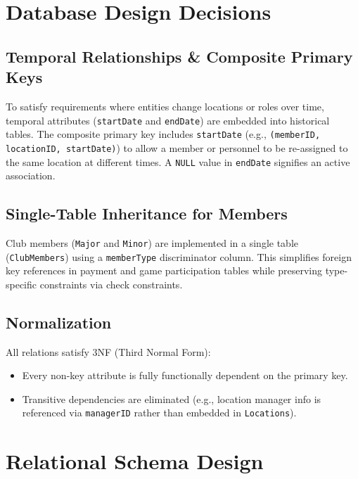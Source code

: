 \documentclass[11pt,a4paper]{article}
\begin{document}
\section{Database Design Decisions}


\subsection{Temporal Relationships \& Composite Primary Keys}

To satisfy requirements where entities change locations or roles over time, temporal attributes (\texttt{startDate} and \texttt{endDate}) are embedded into historical tables. The composite primary key includes \texttt{startDate} (e.g., \texttt{(memberID, locationID, startDate)}) to allow a member or personnel to be re-assigned to the same location at different times. A \texttt{NULL} value in \texttt{endDate} signifies an active association.


\subsection{Single-Table Inheritance for Members}

Club members (\texttt{Major} and \texttt{Minor}) are implemented in a single table (\texttt{ClubMembers}) using a \texttt{memberType} discriminator column. This simplifies foreign key references in payment and game participation tables while preserving type-specific constraints via check constraints.


\subsection{Normalization}

All relations satisfy 3NF (Third Normal Form):
\begin{itemize}
\item Every non-key attribute is fully functionally dependent on the primary key.
\item Transitive dependencies are eliminated (e.g., location manager info is referenced via \texttt{managerID} rather than embedded in \texttt{Locations}).
\end{itemize}





\section{Relational Schema Design}
\end{document}
